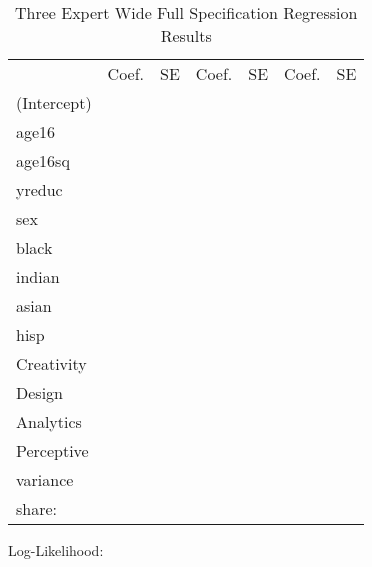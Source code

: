\documentclass[12pt]{article}
\begin{document}
\begin{landscape}
\begin{table} \centering
  \caption{Three Expert Wide Full Specification Regression Results}
    \begin{threeparttable}
      {\small
      \begin{tabular}[l]{l r r r r r r}
\cmidrule{1-7}    
                 & Coef.  &  SE   &  Coef.  &  SE   &  Coef.  &  SE   \\
\cmidrule(l){2-3}  \cmidrule(l){4-5}  \cmidrule(l){6-7}    
(Intercept)      &     &      &      &     &      &    \\
age16            &     &      &      &     &      &    \\
age16sq          &     &      &      &     &      &    \\
yreduc           &     &      &      &     &      &    \\
sex              &     &      &      &     &      &    \\
black            &     &      &      &     &      &    \\
indian           &     &      &      &     &      &    \\
asian            &     &      &      &     &      &    \\
hisp             &     &      &      &     &      &    \\
Creativity       &     &      &      &     &      &    \\
Design           &     &      &      &     &      &    \\
Analytics        &     &      &      &     &      &    \\
Perceptive       &     &      &      &     &      &    \\
variance         &     &      &      &     &      &    \\
\cmidrule(l){2-3}  \cmidrule(l){4-5}  \cmidrule(l){6-7}          
share:           &           &      &            &       &            &      \\ 
\cmidrule{1-7}     
      \end{tabular}
      }
      \begin{tablenotes}
        \item Log-Likelihood:

      \end{tablenotes} \label{tbl:3E_W_full_regressions_results}


    \end{threeparttable}

\end{table}



\end{landscape}
\end{document}
